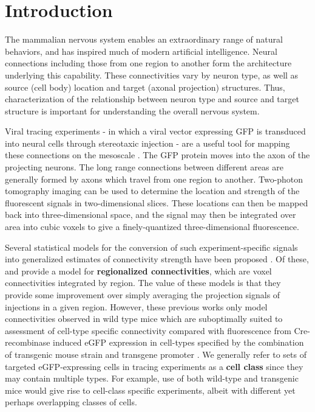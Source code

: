\section{Introduction}
 
The mammalian nervous system enables an extraordinary range of natural behaviors, and has inspired much of modern artificial intelligence.
Neural connections including those from one region to another form the architecture underlying this capability.
These connectivities vary by neuron type, as well as source (cell body) location and target (axonal projection) structures.
Thus, characterization of the relationship between neuron type and source and target structure is important for understanding the overall nervous system.

Viral tracing experiments - in which a viral vector expressing GFP is transduced into neural cells through stereotaxic injection - are a useful tool for mapping these connections on the mesoscale \citep{Chamberlin1998-hi,Harris2012-fw, Daigle2018-gd}.
The GFP protein moves into the axon of the projecting neurons. The long range connections between different areas are generally formed by axons which travel from one region to another. 
Two-photon tomography imaging can be used to determine the location and strength of the fluorescent signals in two-dimensional slices.
These locations can then be mapped back into three-dimensional space, and the signal may then be integrated over area into cubic voxels to give a finely-quantized three-dimensional fluorescence.

Several statistical models for the conversion of such experiment-specific signals into generalized estimates of connectivity strength have been proposed \citep{Oh2014-kh, Harris2016-fn, Gamanut2018-sd, Knox2019-ot}.
Of these, \citet{Oh2014-kh} and \citet{Knox2019-ot} provide a model for \textbf{regionalized connectivities}, which are voxel connectivities integrated by region.
The value of these models is that they provide some improvement over simply averaging the projection signals of injections in a given region.
However, these previous works only model connectivities observed in wild type mice which are suboptimally suited to assessment of cell-type specific connectivity compared with fluorescence from Cre-recombinase induced eGFP expression in cell-types specified by the combination of transgenic mouse strain and transgene promoter \citep{Harris2019-mr}.
We generally refer to sets of targeted eGFP-expressing cells in tracing experiments as a \textbf{cell class} since they may contain multiple types.
For example, use of both wild-type and transgenic mice would give rise to cell-class specific experiments, albeit with different yet perhaps overlapping classes of cells.


